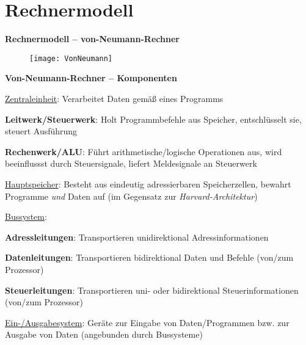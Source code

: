 \section{Rechnermodell}
\label{sec:rechnermodell}

\textbf{Rechnermodell -- von-Neumann-Rechner}
\begin{figure}[ht]
  \centering
  \texttt{[image: VonNeumann]}
  \label{VonNeumann}
\end{figure}

\textbf{Von-Neumann-Rechner -- Komponenten}
\begin{items}
	\item \underline{Zentraleinheit}: Verarbeitet Daten gemäß eines Programms
	\begin{enumeration}
		\item \textbf{Leitwerk/Steuerwerk}: Holt Programmbefehle aus Speicher, entschlüsselt sie, steuert Ausführung
		\item \textbf{Rechenwerk/ALU}: Führt arithmetische/logische Operationen aus, wird beeinflussst durch Steuersignale, liefert Meldesignale an Steuerwerk
	\end{enumeration}
	\item \underline{Hauptspeicher}: Besteht aus eindeutig adressierbaren Speicherzellen, bewahrt Programme \emph{und} Daten auf (im Gegensatz zur \emph{Harvard-Architektur})
	\item \underline{Bussystem}:
	\begin{enumeration}
		\item \textbf{Adressleitungen}: Transportieren unidirektional Adressinformationen
		\item \textbf{Datenleitungen}: Transportieren bidirektional Daten und Befehle (von/zum Prozessor)
		\item \textbf{Steuerleitungen}: Transportieren uni- oder bidirektional Steuerinformationen (von/zum Prozessor)
	\end{enumeration}
	\item \underline{Ein-/Ausgabesystem}: Geräte zur Eingabe von Daten/Programmen bzw. zur Ausgabe von Daten (angebunden durch Bussysteme)
\end{items}

\newpage

